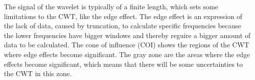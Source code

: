 The signal of the wavelet is typically of a finite length, which sets some limitations to the CWT, like the edge effect. The edge effect is an expression of the lack of data, caused by truncation, to calculate specific frequencies because the lower frequencies have bigger windows and thereby reguire a bigger amount of data to be calculated.\cite{mari1999} The cone of influence (COI) shows the regions of the CWT where edge effects become significant. The gray zone are the areas where the edge effects become significant, which means that there will be some uncertainties to the CWT in this zone. \cite{mathworks2017}


